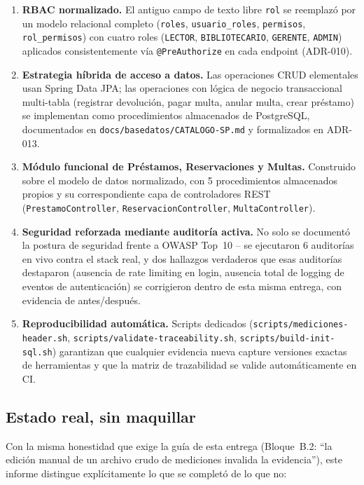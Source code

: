\documentclass[12pt,a4paper]{article}
\begin{document}
\begin{enumerate}[leftmargin=1.2cm]
  \item \textbf{RBAC normalizado.} El antiguo campo de texto libre
    \texttt{rol} se reemplazó por un modelo relacional completo
    (\texttt{roles}, \texttt{usuario\_roles}, \texttt{permisos},
    \texttt{rol\_permisos}) con cuatro roles (\texttt{LECTOR},
    \texttt{BIBLIOTECARIO}, \texttt{GERENTE}, \texttt{ADMIN}) aplicados
    consistentemente vía \texttt{@PreAuthorize} en cada endpoint
    (ADR-010).
  \item \textbf{Estrategia híbrida de acceso a datos.} Las operaciones
    CRUD elementales usan Spring Data JPA; las operaciones con lógica de
    negocio transaccional multi-tabla (registrar devolución, pagar
    multa, anular multa, crear préstamo) se implementan como
    procedimientos almacenados de PostgreSQL, documentados en
    \texttt{docs/basedatos/CATALOGO-SP.md} y formalizados en ADR-013.
  \item \textbf{Módulo funcional de Préstamos, Reservaciones y Multas.}
    Construido sobre el modelo de datos normalizado, con 5 procedimientos
    almacenados propios y su correspondiente capa de controladores REST
    (\texttt{PrestamoController}, \texttt{ReservacionController},
    \texttt{MultaController}).
  \item \textbf{Seguridad reforzada mediante auditoría activa.} No solo
    se documentó la postura de seguridad frente a OWASP Top~10 --
    se ejecutaron 6 auditorías en vivo contra el stack real, y dos
    hallazgos verdaderos que esas auditorías destaparon
    (ausencia de rate limiting en login, ausencia total de logging de
    eventos de autenticación) se corrigieron dentro de esta misma
    entrega, con evidencia de antes/después.
  \item \textbf{Reproducibilidad automática.} Scripts dedicados
    (\texttt{scripts/mediciones-header.sh},
    \texttt{scripts/validate-traceability.sh},
    \texttt{scripts/build-init-sql.sh}) garantizan que cualquier
    evidencia nueva capture versiones exactas de herramientas y que la
    matriz de trazabilidad se valide automáticamente en CI.
\end{enumerate}

\subsection*{Estado real, sin maquillar}

Con la misma honestidad que exige la guía de esta entrega (Bloque~B.2:
``la edición manual de un archivo crudo de mediciones invalida la
evidencia''), este informe distingue explícitamente lo que se completó
de lo que no:
\end{document}
